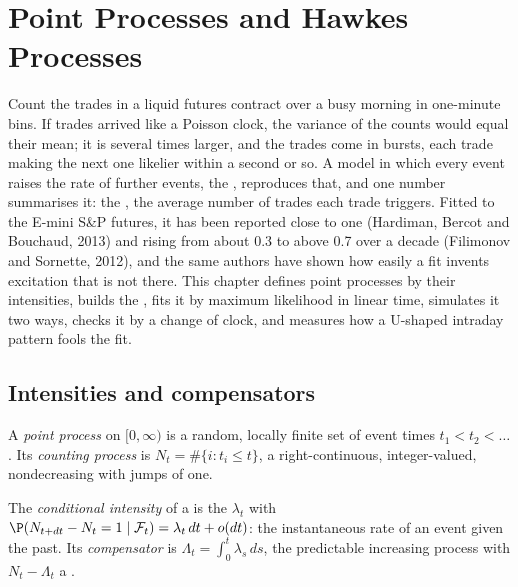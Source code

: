 \chapter{Point Processes and Hawkes Processes}\label{ch:qm:point-processes-and-hawkes-processes}

Count the trades in a liquid futures contract over a busy morning in one-minute bins. If trades
arrived like a Poisson clock, the variance of the counts would equal their mean; it is several
times larger, and the trades come in bursts, each trade making the next one likelier within a
second or so. A model in which every event raises the rate of further events, the , reproduces that, and one number summarises it: the , the average number
of trades each trade triggers. Fitted to the E-mini S\&P futures, it has been reported close to
one (Hardiman, Bercot and Bouchaud, 2013) and rising from about 0.3 to above 0.7 over a decade (Filimonov and
Sornette, 2012), and the same authors have shown how easily a fit invents excitation that is not
there. This chapter defines point processes by their intensities, builds the , fits
it by maximum likelihood in linear time, simulates it two ways, checks it by a change of clock, and
measures how a U-shaped intraday pattern fools the fit.

\section{Intensities and compensators}

\begin{definition}\label{def:qm:point-processes-and-hawkes-processes:pp}
A \emph{point process} on $[0, \infty)$ is a random, locally finite set of event
times $t_1 < t_2 < \dots$. Its \emph{counting process} is $N_t = \#\{i : t_i \le t\}$,
a right-continuous, integer-valued, nondecreasing  with jumps of one.
\end{definition}

\begin{definition}\label{def:qm:point-processes-and-hawkes-processes:intensity}
The \emph{conditional intensity} of a  is the 
$\lambda_t$ with $\P(N_{t+dt} - N_t = 1 \mid \mathcal F_t) = \lambda_t\,dt + o(dt)$: the instantaneous rate of an event
given the past. Its \emph{compensator} is $\Lambda_t = \int_0^t\lambda_s\,ds$, the predictable
increasing process with $N_t - \Lambda_t$ a .
\end{definition}

